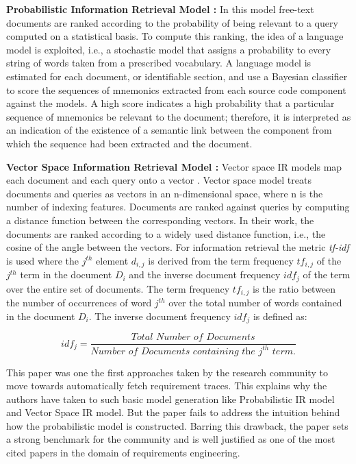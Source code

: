 \documentclass{report}
\begin{document}
\textbf{Probabilistic Information Retrieval Model : } In this model free-text
documents are ranked according to the probability of being relevant to a query
computed on a statistical basis. To compute this ranking, the idea of a language
model is exploited, i.e., a stochastic model that assigns a probability to every
string of words taken from a prescribed vocabulary. A language model is estimated for
each document, or identifiable section, and use a Bayesian classifier to score the
sequences of mnemonics extracted from each source code component against the models.
A high score indicates a high probability that a particular sequence of mnemonics be
relevant to the document; therefore, it is interpreted as an indication of the
existence of a semantic link between the component from which the sequence had been
extracted and the document.

\textbf{Vector Space Information Retrieval Model : } Vector space IR models map each
document and each query onto a vector \cite{rankingAlgosHarman92}. Vector space model
treats documents and queries as vectors in an n-dimensional space, where n is the
number of indexing features. Documents are ranked against queries by computing a
distance function between the corresponding vectors. In their work, the documents are
ranked according to a widely used distance function, i.e., the cosine of the angle
between the vectors. For information retrieval the metric \textit{tf-idf} \cite{saltonTFIDF88} is used where the ${j}^{th}$ element $d_{i,j}$ is
derived from the term frequency $tf_{i,j}$ of the $j^{th}$ term in the document
$D_{i}$ and the inverse document frequency $idf_j$ of the term over
the entire set of documents. The term frequency $tf_{i,j}$ is the
ratio between the number of occurrences of word $j^{th}$ over
the total number of words contained in the document $D_i$.
The inverse document frequency $idf_j$ is defined as:

\[ idf_j = \frac{\textit{Total Number of Documents}}{\textit{Number of Documents containing the $j^{th}$ term.}} \]

This paper was one the first approaches taken by the research community to move 
towards automatically fetch requirement traces. This explains why the authors have
taken to such basic model generation like Probabilistic IR model and Vector Space IR
model. But the paper fails to address the intuition behind how the probabilistic model is constructed. Barring this drawback, the paper sets a strong benchmark for
the community and is well justified as one of the most cited papers in the domain
of requirements engineering. 
\end{document}
